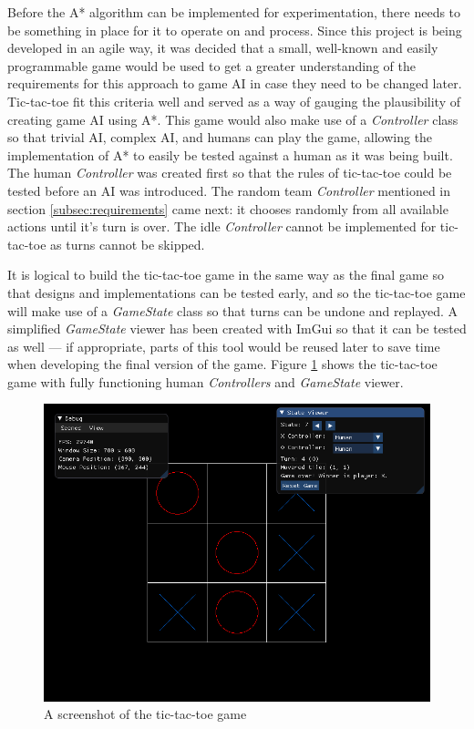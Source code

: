 \documentclass[11pt, a4paper]{report}
\begin{document}
Before the A* algorithm can be implemented for experimentation, there needs to be something in place for it to operate on and process. Since this project is being developed in an agile way, it was decided that a small, well-known and easily programmable game would be used to get a greater understanding of the requirements for this approach to game AI in case they need to be changed later. Tic-tac-toe fit this criteria well and served as a way of gauging the plausibility of creating game AI using A*. This game would also make use of a \emph{Controller} class so that trivial AI, complex AI, and humans can play the game, allowing the implementation of A* to easily be tested against a human as it was being built. The human \emph{Controller} was created first so that the rules of tic-tac-toe could be tested before an AI was introduced. The random team \emph{Controller} mentioned in section \ref{subsec:requirements} came next: it chooses randomly from all available actions until it's turn is over. The idle \emph{Controller} cannot be implemented for tic-tac-toe as turns cannot be skipped.

It is logical to build the tic-tac-toe game in the same way as the final game so that designs and implementations can be tested early, and so the tic-tac-toe game will make use of a \emph{GameState} class so that turns can be undone and replayed. A simplified \emph{GameState} viewer has been created with ImGui so that it can be tested as well --- if appropriate, parts of this tool would be reused later to save time when developing the final version of the game. Figure \ref{fig:ticTacToeGame} shows the tic-tac-toe game with fully functioning human \emph{Controllers} and \emph{GameState} viewer.

\begin{figure}[!h]
  \centering
  \includegraphics[width=\linewidth]{img/tictactoe_game.png}
  \caption{A screenshot of the tic-tac-toe game}
  \label{fig:ticTacToeGame}
\end{figure}
\end{document}
